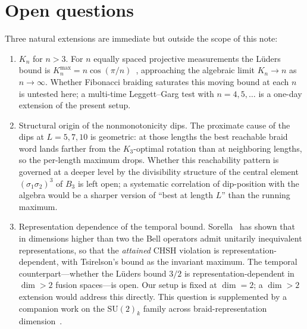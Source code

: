 \documentclass[aps,prx,reprint,amsmath,amssymb,floatfix,nofootinbib,superscriptaddress]{revtex4-2}
\begin{document}
\section{Open questions}
\label{sec:open}

Three natural extensions are immediate but outside the scope of this
note:
\begin{enumerate}
\item[\textbf{O1.}] $K_{n}$ for $n > 3$. For $n$ equally spaced
projective measurements the L\"uders bound is
$K_{n}^{\max} = n\cos(\pi/n)$~\cite{EmaryLambertNori2014}, approaching
the algebraic limit $K_{n} \to n$ as $n \to \infty$. Whether
Fibonacci braiding saturates this moving bound at each $n$ is
untested here; a multi-time Leggett--Garg test with $n=4,5,\ldots$ is
a one-day extension of the present setup.
\item[\textbf{O2.}] Structural origin of the nonmonotonicity dips.
The proximate cause of the dips at $L = 5, 7, 10$ is geometric: at
those lengths the best reachable braid word lands farther from the
$K_{3}$-optimal rotation than at neighboring lengths, so the
per-length maximum drops. Whether this reachability pattern is
governed at a deeper level by the divisibility structure of the
central element $(\sigma_{1}\sigma_{2})^{3}$ of $B_{3}$ is left open;
a systematic correlation of dip-position with the algebra would be a
sharper version of ``best at length $L$'' than the running maximum.
\item[\textbf{O3.}] Representation dependence of the temporal bound.
Sorella~\cite{Sorella2023} has shown that in dimensions higher than
two the Bell operators admit unitarily inequivalent representations,
so that the \emph{attained} CHSH violation is representation-dependent,
with Tsirelson's bound as the invariant maximum. The
temporal counterpart---whether the L\"uders bound $3/2$ is
representation-dependent in $\dim > 2$ fusion spaces---is open. Our
setup is fixed at $\dim = 2$; a $\dim > 2$ extension would address
this directly. This question is supplemented by a companion work on
the $\mathrm{SU}(2)_k$ family across braid-representation
dimension~\cite{Sayim2026SU2k}.
\end{enumerate}
\end{document}
